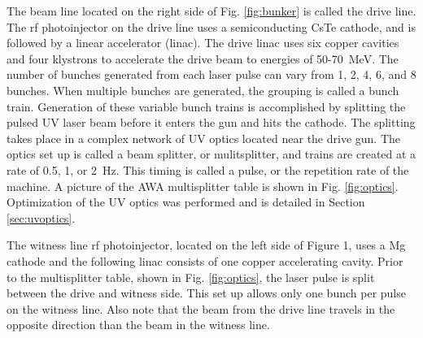 \documentclass{iitthesis}
\begin{document}
The beam line located on the right side of Fig. \ref{fig:bunker} is called the
drive line. The rf photoinjector on the drive line uses a semiconducting
CsTe cathode, and is followed by a linear accelerator (linac). The
drive linac uses six copper cavities and four klystrons to accelerate the drive beam
to energies of 50-\SI{70}{MeV}. The number of bunches generated from each 
laser pulse can vary from 1, 2, 4, 6, and 8 bunches. When multiple bunches
are generated, the grouping is called a bunch train. Generation of
these variable bunch trains is accomplished by splitting the pulsed
UV laser beam before it enters the gun and hits the cathode. The splitting
takes place in a complex network of UV optics located near the drive
gun. The optics set up is called a beam splitter, or mulitsplitter,
and trains are created at a rate of 0.5, 1, or \SI{2}{Hz}. This timing is
called a pulse, or the repetition rate of the machine. A picture of
the AWA multisplitter table is shown in Fig. \ref{fig:optics}. Optimization 
of the UV optics was performed and is detailed in Section \ref{sec:uvoptics}.  

The witness line rf photoinjector, located on the left side of Figure
1, uses a Mg cathode and the following linac consists of one copper
accelerating cavity. Prior to the multisplitter table, shown in
Fig. \ref{fig:optics}, the laser pulse is split between the drive and witness side.
This set up allows only one bunch per pulse on the witness line. Also
note that the beam from the drive line travels in the opposite direction
than the beam in the witness line. 
\end{document}
